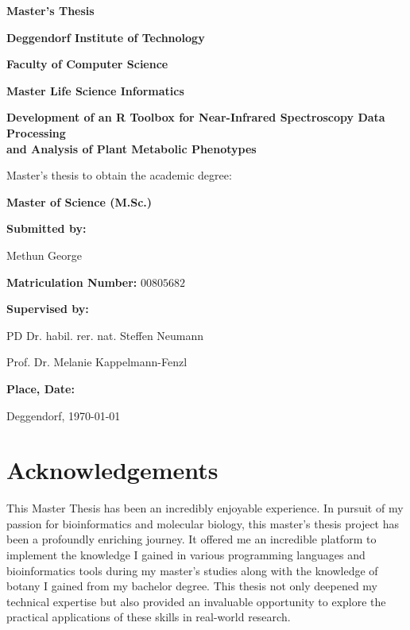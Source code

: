 \documentclass[12pt,a4paper]{report}
\begin{document}
\begin{titlepage}
    \centering
    {\Large \textbf{Master's Thesis} \par}
    \vspace{0.4cm}
    {\large \textbf{Deggendorf Institute of Technology} \par}
    
    \vspace{0.4cm}
    {\large \textbf{Faculty of Computer Science} \par}
    \vspace{0.4cm}
    {\large \textbf{Master Life Science Informatics} \par}
    \vspace{1.5cm}

    {\LARGE\bfseries Development of an R Toolbox for Near-Infrared Spectroscopy Data Processing \\
    and Analysis of Plant Metabolic Phenotypes\par}
    \vspace{1.5cm}

    {\small Master's thesis to obtain the academic degree: \par}
    {\large \textbf{Master of Science (M.Sc.)} \par}
    \vspace{1.5cm}

    \textbf{Submitted by:} \par
    {\large Methun George\par}  
    \vspace{0.3cm}

    \textbf{Matriculation Number:}  $00805682$
    \vspace{0.8cm}

    \textbf{Supervised by:} \par
    {\small PD Dr. habil. rer. nat. Steffen Neumann\par}
    {\small Prof. Dr. Melanie Kappelmann-Fenzl}
    \vspace{1.5cm}

    \textbf{Place, Date:} \par
    {\small Deggendorf, \today}
\end{titlepage}

  





\newpage
\section*{Acknowledgements}
This Master Thesis has been an incredibly enjoyable experience. In pursuit of my passion for bioinformatics and molecular biology, this master’s thesis project has been a profoundly enriching journey. It offered me an incredible platform to implement the knowledge I gained in various programming languages and bioinformatics tools during my master’s studies along with the knowledge of botany I gained from my bachelor degree. This thesis not only deepened my technical expertise but also provided an invaluable opportunity to explore the practical applications of these skills in real-world research. \\
\end{document}
